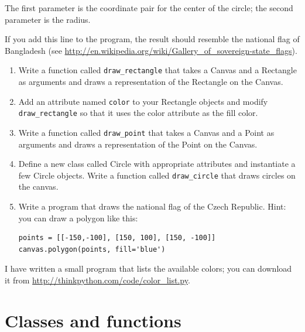 \documentclass[10pt]{book}
\begin{document}
\begin{exercise}
The first parameter is the coordinate pair for the center of the
circle; the second parameter is the radius.

If you add this line to the program,
the result should resemble the national flag of Bangladesh
(see \url{http://en.wikipedia.org/wiki/Gallery_of_sovereign-state_flags}).

\begin{enumerate}

\item Write a function called \verb"draw_rectangle" that takes a
  Canvas and a Rectangle as arguments and draws a
  representation of the Rectangle on the Canvas.

\item Add an attribute named {\tt color} to your Rectangle objects and
  modify \verb"draw_rectangle" so that it uses the color attribute as
  the fill color.

\item Write a function called \verb"draw_point" that takes a
  Canvas and a Point as arguments and draws a
  representation of the Point on the Canvas.

\item Define a new class called Circle with appropriate attributes and
  instantiate a few Circle objects.  Write a function called
  \verb"draw_circle" that draws circles on the canvas.

\item Write a program that draws the national flag of the Czech Republic.
Hint: you can draw a polygon like this:

\begin{verbatim}
points = [[-150,-100], [150, 100], [150, -100]]
canvas.polygon(points, fill='blue')
\end{verbatim}

\end{enumerate}

I have written a small program that lists the available colors;
you can download it from \url{http://thinkpython.com/code/color_list.py}.

\end{exercise}


\chapter{Classes and functions}
\label{time}
\end{document}
